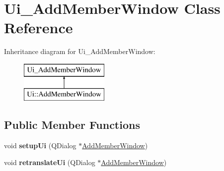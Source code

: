 \hypertarget{class_ui___add_member_window}{}\section{Ui\+\_\+\+Add\+Member\+Window Class Reference}
\label{class_ui___add_member_window}
Inheritance diagram for Ui\+\_\+\+Add\+Member\+Window\+:\begin{figure}[H]
\begin{center}
\leavevmode
\includegraphics[height=2.000000cm]{class_ui___add_member_window}
\end{center}
\end{figure}
\subsection*{Public Member Functions}
\begin{DoxyCompactItemize}
\item 
\mbox{\label{class_ui___add_member_window_a1265a4e51b3e565abf73f6fd205f6e59}} 
void {\bfseries setup\+Ui} (Q\+Dialog $\ast$\mbox{\hyperlink{class_add_member_window}{Add\+Member\+Window}})
\item 
\mbox{\label{class_ui___add_member_window_ad408f934104173e0e29cbe5b449bd4fe}} 
void {\bfseries retranslate\+Ui} (Q\+Dialog $\ast$\mbox{\hyperlink{class_add_member_window}{Add\+Member\+Window}})
\end{DoxyCompactItemize}
